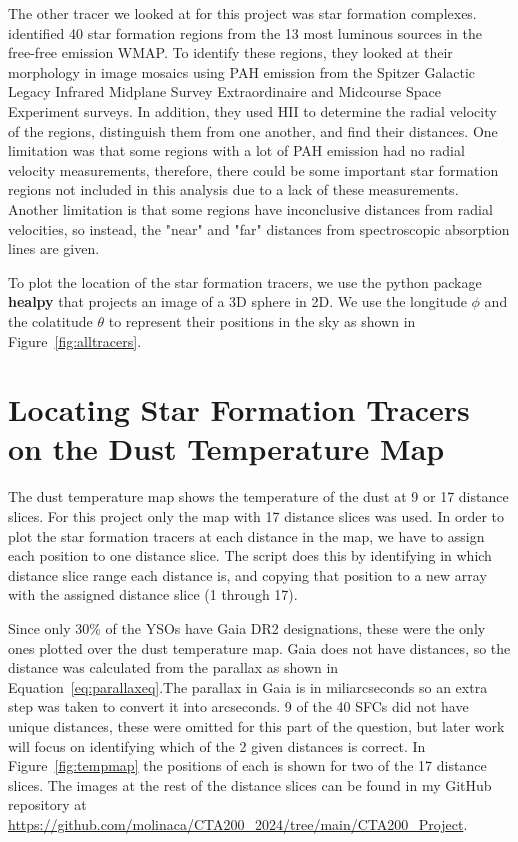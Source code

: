 \documentclass[12pt]{article}
\begin{document}
The other tracer we looked at for this project was star formation complexes. \cite{RahmanMurray2010} identified 40 star formation regions from the 13 most luminous sources in the free-free emission WMAP. To identify these regions, they looked at their morphology in image mosaics using PAH emission from the Spitzer Galactic Legacy Infrared Midplane Survey Extraordinaire \parencite[GLIMPSE]{Benjamin2003} and Midcourse Space Experiment \parencite[MSX]{Price_2001} surveys. In addition, they used H\textsc{II} to determine the radial velocity of the regions, distinguish them from one another, and find their distances. One limitation was that some regions with a lot of PAH emission had no radial velocity measurements, therefore, there could be some important star formation regions not included in this analysis due to a lack of these measurements. Another limitation is that some regions have inconclusive distances from radial velocities, so instead, the "near" and "far" distances from spectroscopic absorption lines are given. 


To plot the location of the star formation tracers, we use the python package \textbf{healpy} that projects an image of a 3D sphere in 2D. We use the longitude $\phi$ and the colatitude $\theta$ to represent their positions in the sky as shown in Figure~\ref{fig:alltracers}. 

\section{Locating Star Formation Tracers on the Dust Temperature Map}


The dust temperature map shows the temperature of the dust at 9 or 17 distance slices. For this project only the map with 17 distance slices was used. In order to plot the star formation tracers at each distance in the map, we have to assign each position to one distance slice. The script does this by identifying in which distance slice range each distance is, and copying that position to a new array with the assigned distance slice (1 through 17). 

Since only 30\% of the YSOs have Gaia DR2 designations, these were the only ones plotted over the dust temperature map. Gaia does not have distances, so the distance was calculated from the parallax as shown in Equation~\ref{eq:parallaxeq}.The parallax in Gaia is in miliarcseconds so an extra step was taken to convert it into arcseconds. 9 of the 40 SFCs did not have unique distances, these were omitted for this part of the question, but later work will focus on identifying which of the 2 given distances is correct. In Figure~\ref{fig:tempmap} the positions of each is shown for two of the 17 distance slices. The images at the rest of the distance slices can be found in my GitHub repository at \url{https://github.com/molinaca/CTA200_2024/tree/main/CTA200_Project}.
\end{document}
